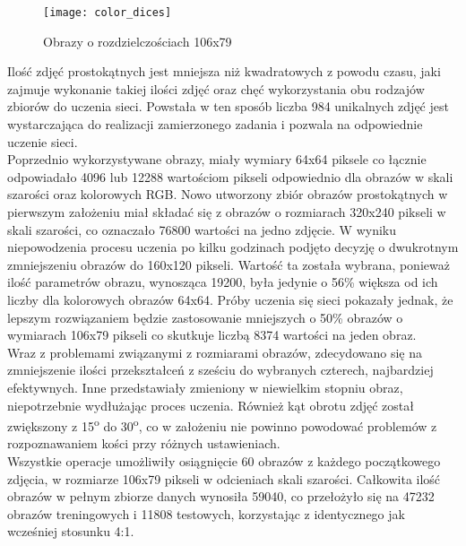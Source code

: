 \begin{figure}[h]
\centering
\texttt{[image: color\_dices]}
\caption{Obrazy o rozdzielczościach 106x79}
\end{figure}

Ilość zdjęć prostokątnych jest mniejsza niż kwadratowych z powodu czasu, jaki zajmuje
wykonanie takiej ilości zdjęć oraz chęć wykorzystania obu rodzajów zbiorów do uczenia sieci.
Powstała w ten sposób liczba 984 unikalnych zdjęć jest wystarczająca do realizacji
zamierzonego zadania i pozwala na odpowiednie uczenie sieci. \\
Poprzednio wykorzystywane obrazy, miały wymiary 64x64 piksele co łącznie odpowiadało
4096 lub 12288 wartościom pikseli odpowiednio dla obrazów w skali szarości oraz
kolorowych RGB. Nowo utworzony zbiór obrazów prostokątnych w pierwszym założeniu miał
składać się z obrazów o rozmiarach 320x240 pikseli w skali szarości, co oznaczało
76800 wartości na jedno zdjęcie. W wyniku niepowodzenia procesu uczenia po kilku godzinach podjęto decyzję o dwukrotnym zmniejszeniu obrazów do 160x120 pikseli. Wartość ta
została wybrana, ponieważ ilość parametrów obrazu, wynosząca 19200, była jedynie o 56\%
większa od ich liczby dla kolorowych obrazów 64x64. Próby uczenia się sieci pokazały jednak,
że lepszym rozwiązaniem będzie zastosowanie mniejszych o 50\% obrazów o wymiarach
106x79 pikseli co skutkuje liczbą 8374 wartości na jeden obraz.\\
Wraz z problemami związanymi z rozmiarami obrazów, zdecydowano się na zmniejszenie ilości
przekształceń z sześciu do wybranych czterech, najbardziej efektywnych. Inne przedstawiały
zmieniony w niewielkim stopniu obraz, niepotrzebnie wydłużając proces
uczenia. Również kąt obrotu zdjęć został zwiększony z 15\textsuperscript{o}
do 30\textsuperscript{o}, co w założeniu nie powinno powodować problemów z rozpoznawaniem
kości przy różnych ustawieniach. \\
Wszystkie operacje umożliwiły osiągnięcie 60 obrazów z każdego początkowego zdjęcia, w rozmiarze
106x79 pikseli w odcieniach skali szarości. Całkowita ilość obrazów w pełnym zbiorze
danych wynosiła 59040, co przełożyło się na 47232 obrazów treningowych i 11808 testowych,
korzystając z identycznego jak wcześniej stosunku 4:1.
